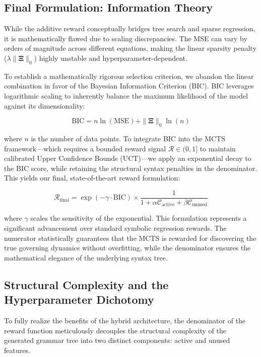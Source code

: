 \documentclass[11pt,a4paper]{article}
\begin{document}
\subsection{Final Formulation: Information Theory}
While the additive reward conceptually bridges tree search and sparse regression, it is mathematically flawed due to scaling discrepancies. The MSE can vary by orders of magnitude across different equations, making the linear sparsity penalty ($\lambda \|\mathbf{\Xi}\|_0$) highly unstable and hyperparameter-dependent.

To establish a mathematically rigorous selection criterion, we abandon the linear combination in favor of the Bayesian Information Criterion (BIC). BIC leverages logarithmic scaling to inherently balance the maximum likelihood of the model against its dimensionality:

\begin{equation}
    \text{BIC} = n \ln(\text{MSE}) + \|\mathbf{\Xi}\|_0 \ln(n)
\end{equation}

where $n$ is the number of data points. To integrate BIC into the MCTS framework—which requires a bounded reward signal $\mathcal{R} \in (0, 1]$ to maintain calibrated Upper Confidence Bounds (UCT)—we apply an exponential decay to the BIC score, while retaining the structural syntax penalties in the denominator. This yields our final, state-of-the-art reward formulation:

\begin{equation}
    \mathcal{R}_{\text{final}} = \exp(-\gamma \cdot \text{BIC}) \times \frac{1}{1 + \alpha \mathcal{C}_{\text{active}} + \beta \mathcal{C}_{\text{unused}}}
\end{equation}

where $\gamma$ scales the sensitivity of the exponential. This formulation represents a significant advancement over standard symbolic regression rewards. The numerator statistically guarantees that the MCTS is rewarded for discovering the true governing dynamics without overfitting, while the denominator ensures the mathematical elegance of the underlying syntax tree.

\subsection{Structural Complexity and the Hyperparameter Dichotomy}
To fully realize the benefits of the hybrid architecture, the denominator of the reward function meticulously decouples the structural complexity of the generated grammar tree into two distinct components: active and unused features. 
\end{document}
